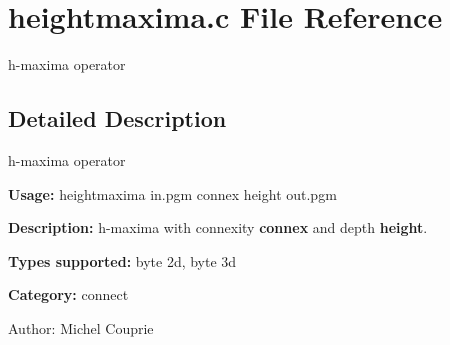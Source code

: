 \section{heightmaxima.c File Reference}
\label{heightmaxima_8c}
h-maxima operator 



\subsection{Detailed Description}
h-maxima operator 

{\bf Usage:} heightmaxima in.pgm connex height out.pgm

{\bf Description:} h-maxima with connexity {\bf connex} and depth {\bf height}.

{\bf Types supported:} byte 2d, byte 3d

{\bf Category:} connect

\begin{Desc}
\item[Author:]Michel Couprie \end{Desc}
